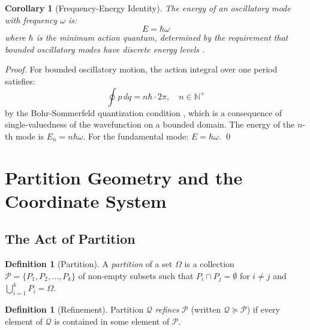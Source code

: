 \documentclass[twocolumn,10pt,a4paper]{article}
\newtheorem{corollary}[theorem]{Corollary}
\theoremstyle{definition}
\newtheorem{definition}[theorem]{Definition}
\theoremstyle{remark}
\newcommand{\Partition}{\mathcal{P}}
\newcommand{\Natural}{\mathbb{N}}
\begin{document}
\begin{corollary}[Frequency-Energy Identity]
\label{cor:freq-energy}
The energy of an oscillatory mode with frequency $\omega$ is:
\begin{equation}
    E = \hbar\omega
    \label{eq:freq-energy}
\end{equation}
where $\hbar$ is the minimum action quantum, determined by the requirement that bounded oscillatory modes have discrete energy levels \citep{planck1901}.
\end{corollary}

\begin{proof}
For bounded oscillatory motion, the action integral over one period satisfies:
\begin{equation}
    \oint p \, dq = n\hbar \cdot 2\pi, \quad n \in \Natural^+
\end{equation}
by the Bohr-Sommerfeld quantization condition \citep{bohr1913,landau1977}, which is a consequence of single-valuedness of the wavefunction on a bounded domain. The energy of the $n$-th mode is $E_n = n\hbar\omega$. For the fundamental mode: $E = \hbar\omega$. \qed
\end{proof}

\section{Partition Geometry and the Coordinate System}
\label{sec:partition}

\subsection{The Act of Partition}

\begin{definition}[Partition]
\label{def:partition}
A \emph{partition} of a set $\Omega$ is a collection $\Partition = \{P_1, P_2, \ldots, P_k\}$ of non-empty subsets such that $P_i \cap P_j = \emptyset$ for $i \neq j$ and $\bigcup_{i=1}^{k} P_i = \Omega$.
\end{definition}

\begin{definition}[Refinement]
\label{def:refinement}
Partition $\mathcal{Q}$ \emph{refines} $\Partition$ (written $\mathcal{Q} \succeq \Partition$) if every element of $\mathcal{Q}$ is contained in some element of $\Partition$.
\end{definition}
\end{document}
